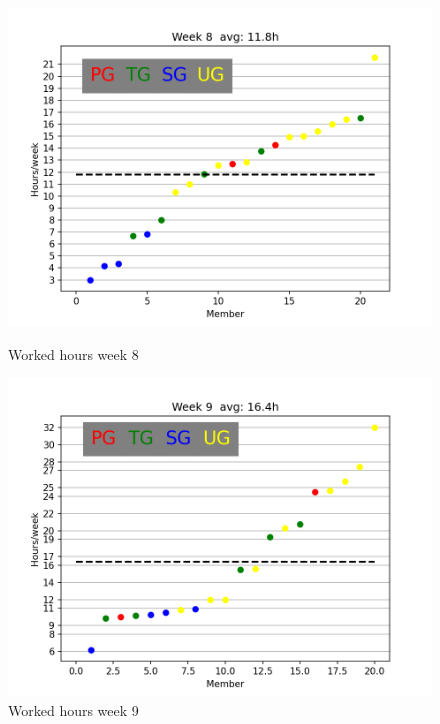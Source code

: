 \documentclass{article}
\begin{document}
        \begin{figure}[!htb]
            \endminipage\hfill
              \includegraphics[width=\linewidth]{images/week_8.png}
              \caption{Worked hours week 8}\label{fig:week8}
            \endminipage\hfill
              \includegraphics[width=\linewidth]{images/week_9.png}
              \caption{Worked hours week 9}\label{fig:week9}
            \endminipage\hfill
            \endminipage\hfill
        \end{figure}
        
        
\end{document}
